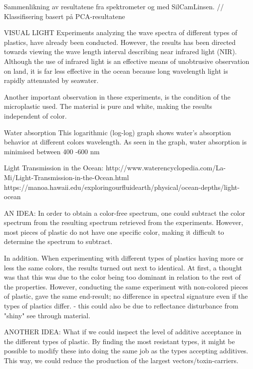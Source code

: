 Sammenlikning av resultatene fra spektrometer og med SilCamLinsen. 
//
Klassifisering basert på PCA-resultatene










VISUAL LIGHT
Experiments analyzing the wave spectra of different types of plastics, have already been conducted. However, the results has been directed towards viewing the wave length interval describing near infrared light (NIR). Although the use of infrared light is an effective means of unobtrusive observation on land, it is far less effective in the ocean because long wavelength light is rapidly attenuated by seawater.

Another important observation in these experiments, is the condition of the microplastic used. The material is pure and white, making the results independent of color. 

Water absorption 
This logarithmic (log-log) graph shows water’s absorption behavior at different colors wavelength. As seen in the graph, water absorption is minimised between 400 -600 nm


Light Transmission in the Ocean: http://www.waterencyclopedia.com/La-Mi/Light-Transmission-in-the-Ocean.html
https://manoa.hawaii.edu/exploringourfluidearth/physical/ocean-depths/light-ocean


AN IDEA:
In order to obtain a color-free spectrum, one could subtract the color spectrum from the resulting spectrum retrieved from the experiments. However, most pieces of plastic do not have one specific color, making it difficult to determine the spectrum to subtract. 

In addition. When experimenting with different types of plastics having more or less the same colors, the results turned out next to identical. At first, a thought was that this was due to the color being too dominant in relation to the rest of the properties. However, conducting the same experiment with non-colored pieces of plastic, gave the same end-result; no difference in spectral signature even if the types of plastics differ. - this could also be due to reflectance disturbance from "shiny" see through material. 

ANOTHER IDEA: 
What if we could inspect the level of additive acceptance in the different types of plastic. By finding the most resistant types, it might be possible to modify these into doing the same job as the types accepting additives. This way, we could reduce the production of the largest vectors/toxin-carriers. 